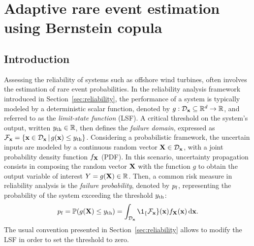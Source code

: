 \cleardoublepage
\chapter{Adaptive rare event estimation using Bernstein copula}
\label{chpt:6}
\hfill
\localtableofcontents
\newpage

\section{Introduction}

Assessing the reliability of systems such as offshore wind turbines, often involves the estimation of rare event probabilities. 
In the reliability analysis framework introduced in Section~\ref{sec:reliability}, the performance of a system is typically modeled by a deterministic scalar function, denoted by $g: \mathcal{D}_{\bf x} \subseteq \mathbb{R}^d \rightarrow \mathbb{R}$, and referred to as the \textit{limit-state function} (LSF). 
A critical threshold on the system's output, written $y_\mathrm{th} \in \mathbb{R}$, then defines the \textit{failure domain}, expressed as $\mathcal{F}_{{\bf x}} = \{{\bf x} \in \mathcal{D}_{\bf x} \, | \,  g({\bf x}) \leq y_\mathrm{th}\}$. 
Considering a probabilistic framework, the uncertain inputs are modeled by a continuous random vector ${\bf X} \in \mathcal{D}_{\bf x}$, with a joint probability density function $f_{\bf X}$ (PDF). 
In this scenario, uncertainty propagation consists in composing the random vector ${\bf X}$ with the function $g$ to obtain the output variable of interest $Y = g({\bf X}) \in \mathbb{R}$. 
Then, a common risk measure in reliability analysis is the \textit{failure probability}, denoted by $p_\mathrm{f}$, representing the probability of the system exceeding the threshold $y_\mathrm{th}$:
\begin{equation}
    \label{eq:failure_proba_c6}
    \pf = \P(g(\bX) \leq \yth)
        = \int_{\iD_\bx} \1_\{\iF_\bx\}(\bx) f_\bX(\bx) \, \dd\bx.
\end{equation}
The usual convention presented in Section~\ref{sec:reliability} allows to modify the LSF in order to set the threshold to zero. 

